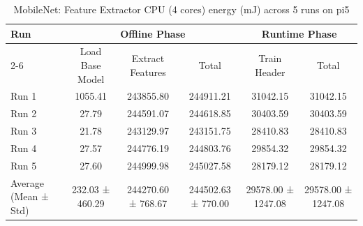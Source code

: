 \begin{table}[t]
\centering
\caption{MobileNet: Feature Extractor CPU (4 cores) energy (mJ) across 5 runs on pi5}
\label{tab:energy_mobilenet_CPU4_pi5}
\begin{tabular}{lccccc}
\hline
\multirow{2}{*}{Run} & \multicolumn{3}{c}{Offline Phase} & \multicolumn{2}{c}{Runtime Phase} \\
\cline{2-6}
 & Load Base Model & Extract Features & Total & Train Header & Total \\
\hline
  Run 1                  & 1055.41        & 243855.80      & 244911.21      & 31042.15       & 31042.15       \\
  Run 2                  & 27.79          & 244591.07      & 244618.85      & 30403.59       & 30403.59       \\
  Run 3                  & 21.78          & 243129.97      & 243151.75      & 28410.83       & 28410.83       \\
  Run 4                  & 27.57          & 244776.19      & 244803.76      & 29854.32       & 29854.32       \\
  Run 5                  & 27.60          & 244999.98      & 245027.58      & 28179.12       & 28179.12       \\
\hline
  Average (Mean ± Std)   & 232.03 ± 460.29 & 244270.60 ± 768.67 & 244502.63 ± 770.00 & 29578.00 ± 1247.08 & 29578.00 ± 1247.08 \\
\hline
\end{tabular}
\end{table}
